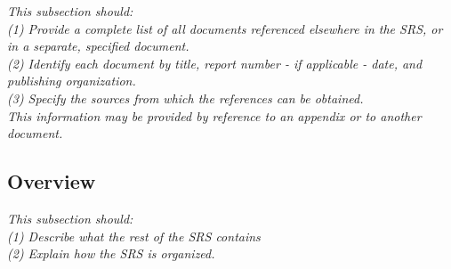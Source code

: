 \textit{This subsection should:} \\
\textit{(1) Provide a complete list of all documents referenced elsewhere in the SRS, or in a separate, specified document.} \\
\textit{(2) Identify each document by title, report number - if applicable - date, and publishing organization.} \\
\textit{(3) Specify the sources from which the references can be obtained.} \\
\textit{This information may be provided by reference to an appendix or to another document.} \\

\subsection{Overview}

\textit{This subsection should:} \\
\textit{(1) Describe what the rest of the SRS contains} \\
\textit{(2) Explain how the SRS is organized.} \\

